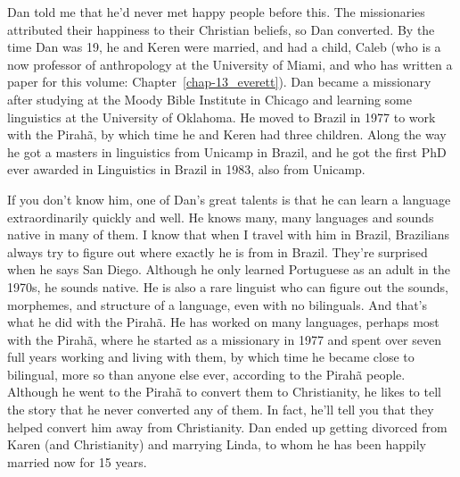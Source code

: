 \documentclass[output=paper,biblatex,babelshorthands,newtxmath,draftmode,colorlinks,citecolor=brown]{langscibook}
\begin{document}
Dan told me that he'd never met happy people before this. The missionaries attributed their happiness to their Christian beliefs, so Dan converted. By the time Dan was 19, he and Keren were married, and had a child, Caleb (who is a now professor of anthropology at the University of Miami, and who has written a paper for this volume: Chapter~\ref{chap-13_everett}). Dan became a missionary after studying at the Moody Bible Institute in Chicago and learning some linguistics at the University of Oklahoma. He moved to Brazil in 1977 to work with the Pirahã, by which time he and Keren had three children. Along the way he got a masters in linguistics from Unicamp in Brazil, and he got the first PhD ever awarded in Linguistics in Brazil in 1983, also from Unicamp. 

If you don't know him, one of Dan's great talents is that he can learn a language extraordinarily quickly and well. He knows many, many languages and sounds native in many of them. I know that when I travel with him in Brazil, Brazilians always try to figure out where exactly he is from in Brazil. They're surprised when he says San Diego. Although he only learned Portuguese as an adult in the 1970s, he sounds native. He is also a rare linguist who can figure out the sounds, morphemes, and structure of a language, even with no bilinguals. And that's what he did with the Pirahã. He has worked on many languages, perhaps most with the Pirahã, where he started as a missionary in 1977 and spent over seven full years working and living with them, by which time he became close to bilingual, more so than anyone else ever, according to the Pirahã people. Although he went to the Pirahã to convert them to Christianity, he likes to tell the story that he never converted any of them. In fact, he'll tell you that they helped convert him away from Christianity. Dan ended up getting divorced from Karen (and Christianity) and marrying Linda, to whom he has been happily married now for 15 years. 
\end{document}
